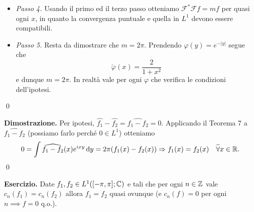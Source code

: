 \begin{itemize}
	\item \textit{Passo 4.} Usando il primo ed il terzo passo otteniamo $\mathcal F^* \mathcal F f = m f$ per quasi ogni $x$, in quanto la convergenza puntuale e quella in $L^1$ devono essere compatibili. 

	\item \textit{Passo 5.} Resta da dimostrare che $m = 2\pi$. Prendendo $\varphi(y) = e^{-|y|}$ segue che
		$$
			\check \varphi(x) = \frac{2}{1 + x^2}
		$$
		e dunque $m = 2\pi$. In realtà vale per ogni $\varphi$ che verifica le condizioni dell'ipotesi.
\end{itemize}
\qed


\textbf{Dimostrazione.} Per ipotesi, $\hat{f_1} - \hat{f_2} = \hat{f_1 - f_2} = 0$.
Applicando il Teorema 7 a $\hat{f_1 - f_2}$ (possiamo farlo perché $0 \in L^1$) otteniamo
%
$$
	0 = \int \widehat{f_1 - f_2}(x) e^{ixy} \,\mathrm{d} y = 2\pi (f_1(x) - f_2(x)) 
	\Rightarrow f_1(x) = f_2(x) \quad \widetilde\forall x \in \mathbb R.
$$
%
\qed


\textbf{Esercizio.}
Date $f_1, f_2 \in L^1([-\pi, \pi]; \mathbb C)$ e tali che per ogni $n \in \mathbb Z$ vale $c_n(f_1) = c_n(f_2)$ allora $f_1 = f_2$ quasi ovunque (e $c_n(f) = 0$ per ogni $n \implies f = 0$ q.o.).









